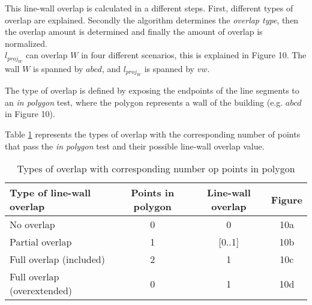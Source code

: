 	This line-wall overlap is calculated in a different steps.
	First, different types of overlap are explained. Secondly the algorithm
	determines the \emph{overlap type}, then the overlap amount is determined and
	finally the amount of overlap is normalized.\\

	$l_{proj_W}$ can overlap $W$ in four different scenarios, this is explained
	in Figure 10. The wall $W$ is spanned by $abcd$, and $l_{proj_W}$ is spanned
	by $vw$.
	
		
	\clearpage


	The type of overlap is defined by exposing the endpoints of the line
	segments to an \emph{in polygon} test, where the polygon represents a 
	wall of the building (e.g. $abcd$ in Figure 10).

	Table \ref{tab:lwatypes} represents the types of overlap with the corresponding number of points
	that pass the \emph{in polygon} test and their possible line-wall overlap
	value.\\ 

	\begin{table}[ht]
		\caption{Types of overlap with corresponding number op points in polygon}
		\label{tab:lwatypes}

		\begin{tabular}{|l||c|c|c|}
		\hline
		Type of line-wall overlap 			&	Points in polygon 			& Line-wall overlap & Figure \\
		\hline
		\hline
		No overlap					&	0					& 0		& 10a\\
		\hline
		Partial overlap 				&	1					& [0..1]	& 10b\\
		\hline
		Full overlap (included)		&	2					& 1		& 10c\\
		\hline
		Full overlap (overextended)		&  	0					& 1 		& 10d\\
		\hline
		\end{tabular}
	\end{table}

